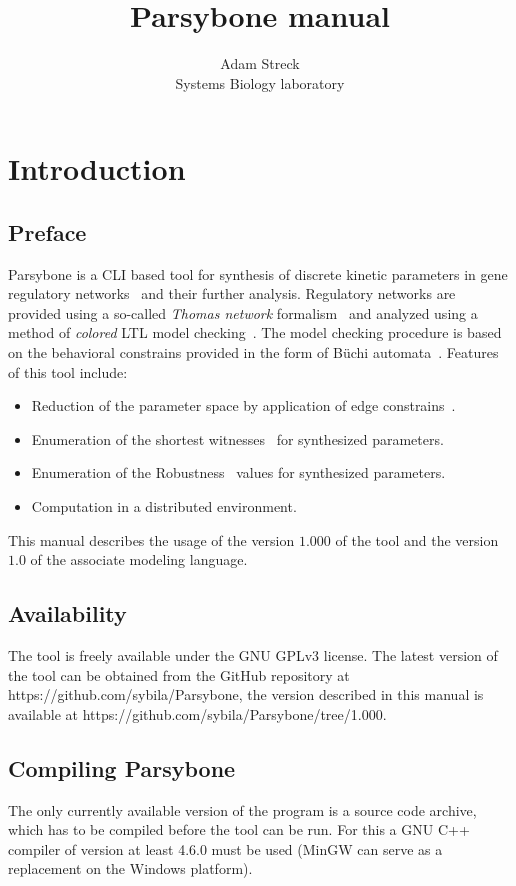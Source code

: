 \documentclass[12pt]{article}
\title{Parsybone  manual}
\author{Adam Streck \\
		Systems Biology laboratory}
\begin{document}
\maketitle

\section{Introduction}
\subsection{Preface}
Parsybone is a CLI based tool for synthesis of discrete kinetic parameters in gene regulatory networks~\cite{TCBB2011} and their further analysis. Regulatory networks are provided using a so-called \emph{Thomas network} formalism~\cite{ThomasR1991} and analyzed using a method of \emph{colored} LTL model checking~\cite{TechReport}. The model checking procedure is based on the behavioral constrains provided in the form of B\"uchi automata~\cite{MCBible}. Features of this tool include:

\begin{itemize}
\item Reduction of the parameter space by application of edge constrains~\cite{TCBB2012}.
\item Enumeration of the shortest witnesses~\cite{TechReport} for synthesized parameters.
\item Enumeration of the \textrm{Robustness}~\cite{TechReport} values for synthesized parameters.
\item Computation in a distributed environment.
\end{itemize}

This manual describes the usage of the version $1.000$ of the tool and the version $1.0$ of the associate modeling language.

\subsection{Availability}
 The tool is freely available under the GNU GPLv3 license. The latest version of the tool can be obtained from the GitHub repository at https://github.com/sybila/Parsybone, the version described in this manual is available at https://github.com/sybila/Parsybone/tree/1.000. 

\subsection{Compiling Parsybone}
The only currently available version of the program is a source code archive, which has to be compiled before the tool can be run. For this a GNU C++ compiler of version at least 4.6.0 must be used (MinGW can serve as a replacement on the Windows platform).
\end{document}
